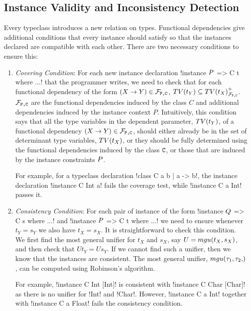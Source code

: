 \documentclass[format=acmsmall,manuscript,screen,nonacm,margin=1in,11pt]{acmart}
\begin{document}
\subsection{Instance Validity and Inconsistency Detection}
Every typeclass introduces a new relation on types. Functional dependencies give
additional conditions that every instance should satisfy so that the
instances declared are compatible with each other. There are two necessary conditions to ensure this:
\begin{enumerate}[topsep={0pt},partopsep={0pt}]
\item\emph{Covering Condition}:  For each new instance declaration !instance $P$ => C t where ...!
  that the programmer writes, we need to check that for each functional dependency of the form $(X \to Y) \in \mathcal{F}_\texttt{P,C}$,
  $TV(t_Y) \subseteq {TV(t_X)}^{+}_{\mathcal{F}_\texttt{P,C}}$.
  $\mathcal{F}_\texttt{P,C}$ are the functional dependencies induced by the class $C$ and additional dependencies
  induced by the instance context $P$. Intuitively, this condition says that
  all the type variables in the dependent parameter, $TV(t_Y)$, of a functional dependency $(X \to Y) \in \mathcal{F}_\texttt{P,C}$,
  should either already be in the set of determinant type variables, $TV(t_X)$,
  or they should be fully determined using the
  functional dependencies induced by the class $\texttt{C}$, or those that are
  induced by the instance constraints $P$.

  For example, for a typeclass declaration
  !class C a b |  a -> b!, the instance declaration !instance C Int a! fails the coverage test,
  while !instance C a Int! passes it.
\item\emph{Consistency Condition}: For each pair of instance of the form !instance $Q$ => C s where ...!
  and !instance $P$ => C t where ...! we need to ensure whenever $t_Y = s_Y$ we also have $t_X = s_X$.
  It is straightforward to check this condition. We first find the most general unifier for $t_X$ and $s_X$,
  say $U=mgu(t_X,s_X) $, and then check that $U t_Y = U s_Y$. If we cannot find such a unifier, then we know that
  the instances are consistent. The most general unifier, $\mgu{\tau_1, \tau_2}$, can be computed using
  Robinson's algorithm\cite{robinson_machine-oriented_1965}.

  For example, !instance C Int [Int]! is consistent with !instance C Char [Char]!
  as there is no unifier for !Int! and !Char!. However, !instance C a Int! together with
  !instance C a Float! fails the consistency condition.%
\end{enumerate}
\end{document}
